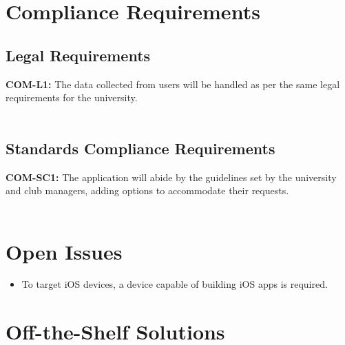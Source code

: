 \documentclass[12pt]{article}
\begin{document}
\section{Compliance Requirements}
\subsection{Legal Requirements}
  \textbf{COM-L1:} The data collected from users will be handled as per the same legal requirements for the university.\\\\
\subsection{Standards Compliance Requirements}
  \textbf{COM-SC1:} The application will abide by the guidelines set by the university and club managers, adding options to accommodate their requests.\\\\

\section{Open Issues}
\begin{itemize}
  \item To target iOS devices, a device capable of building iOS apps is required.
\end{itemize}

\section{Off-the-Shelf Solutions}
\end{document}
